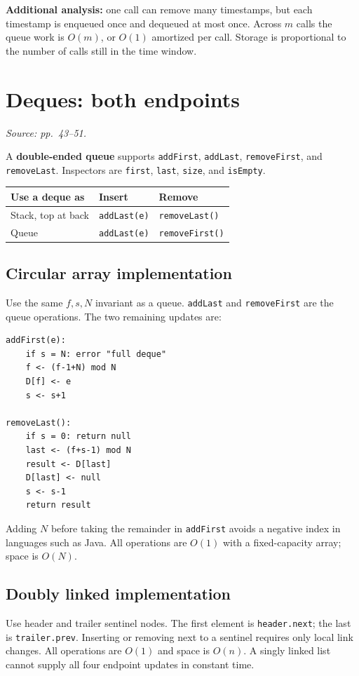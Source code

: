 \documentclass[11pt]{article}
\begin{document}
\textbf{Additional analysis:} one call can remove many timestamps, but each timestamp is enqueued once and dequeued at most once. Across $m$ calls the queue work is $O(m)$, or $O(1)$ amortized per call. Storage is proportional to the number of calls still in the time window.

\section{Deques: both endpoints}
\textit{Source: pp.\ 43--51.}

A \textbf{double-ended queue} supports \texttt{addFirst}, \texttt{addLast}, \texttt{removeFirst}, and \texttt{removeLast}. Inspectors are \texttt{first}, \texttt{last}, \texttt{size}, and \texttt{isEmpty}.

\begin{center}
\begin{tabular}{lll}
\toprule
Use a deque as & Insert & Remove\\
\midrule
Stack, top at back & \texttt{addLast(e)} & \texttt{removeLast()}\\
Queue & \texttt{addLast(e)} & \texttt{removeFirst()}\\
\bottomrule
\end{tabular}
\end{center}

\subsection{Circular array implementation}
Use the same $f,s,N$ invariant as a queue. \texttt{addLast} and \texttt{removeFirst} are the queue operations. The two remaining updates are:
\begin{lstlisting}
addFirst(e):
    if s = N: error "full deque"
    f <- (f-1+N) mod N
    D[f] <- e
    s <- s+1

removeLast():
    if s = 0: return null
    last <- (f+s-1) mod N
    result <- D[last]
    D[last] <- null
    s <- s-1
    return result
\end{lstlisting}
Adding $N$ before taking the remainder in \texttt{addFirst} avoids a negative index in languages such as Java. All operations are $O(1)$ with a fixed-capacity array; space is $O(N)$.

\subsection{Doubly linked implementation}
Use header and trailer sentinel nodes. The first element is \texttt{header.next}; the last is \texttt{trailer.prev}. Inserting or removing next to a sentinel requires only local link changes. All operations are $O(1)$ and space is $O(n)$. A singly linked list cannot supply all four endpoint updates in constant time.
\end{document}

